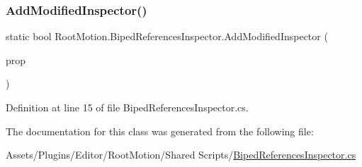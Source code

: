 \subsubsection{\texorpdfstring{Add\+Modified\+Inspector()}{AddModifiedInspector()}}
{\footnotesize\ttfamily static bool Root\+Motion.\+Biped\+References\+Inspector.\+Add\+Modified\+Inspector (\begin{DoxyParamCaption}\item[{Serialized\+Property}]{prop }\end{DoxyParamCaption})\hspace{0.3cm}{\ttfamily [static]}}



Definition at line 15 of file Biped\+References\+Inspector.\+cs.



The documentation for this class was generated from the following file\+:\begin{DoxyCompactItemize}
\item 
Assets/\+Plugins/\+Editor/\+Root\+Motion/\+Shared Scripts/\mbox{\hyperlink{_biped_references_inspector_8cs}{Biped\+References\+Inspector.\+cs}}\end{DoxyCompactItemize}
